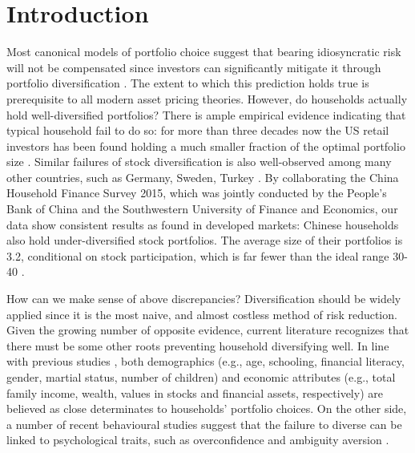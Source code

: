 \documentclass[ukenglish,nottitlepage,thmsb,11pt,letterpaper]{article}
\renewcommand{\thefootnote}{\fnsymbol{footnote}}
\begin{document}

\thispagestyle{empty}
\clearpage
\renewcommand{\thefootnote}{\arabic{footnote}}

\section{Introduction}

Most canonical models of portfolio choice suggest that bearing idiosyncratic risk will not be compensated since investors can significantly mitigate it through portfolio diversification \citep{Markowitz1952}. The extent to which this prediction holds true is prerequisite to all modern asset pricing theories. However, do households actually hold well-diversified portfolios? There is ample empirical  evidence indicating that typical household fail to do so: for more than three decades now the US retail investors has been found holding a much smaller fraction of the optimal portfolio size \citep{Blume1975,Goetzmann2008,Dimmock2016}. Similar failures of stock diversification is also well-observed among many other countries, such as Germany, Sweden, Turkey \citep{Dorn2009,Anderson2013,Fuertes2014}. By collaborating the China Household Finance Survey 2015, which was jointly conducted by the People's Bank of China and the Southwestern University of Finance and Economics, our data show consistent results as found in developed markets: Chinese households also hold under-diversified stock portfolios. The average size of their portfolios is 3.2, conditional on stock participation, which is far fewer than the ideal range 30-40 \citep{Statman1987}.

How can we make sense of above discrepancies? Diversification should be widely applied since it is the most naive, and almost costless method of risk reduction. Given the growing number of opposite evidence, current literature recognizes that there must be some other roots preventing household diversifying well. In line with previous studies \citep{Guiso2002,Campbell2006,Goetzmann2008,Kumar2008,Rooij2011,Gaudecker2015}, both demographics (e.g., age, schooling, financial literacy, gender, martial status, number of children) and economic attributes (e.g., total family income, wealth, values in stocks and financial assets, respectively) are believed as close determinates to households' portfolio choices. On the other side, a number of recent behavioural studies suggest that the failure to diverse can be linked to psychological traits, such as overconfidence \citep{Gaudecker2015,Fuertes2014} and ambiguity aversion \citep{Dimmock2016}.
\end{document}
